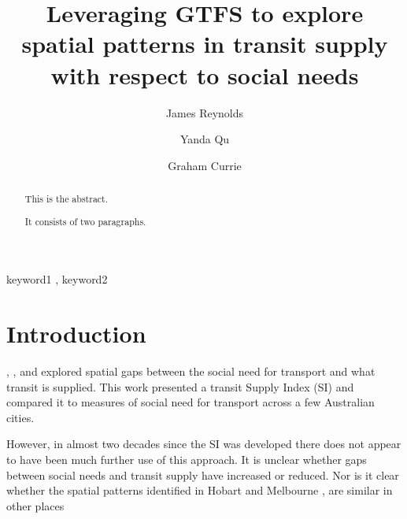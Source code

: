 \documentclass[preprint, 3p,
authoryear]{elsarticle} %
\begin{document}
\begin{frontmatter}

  \title{Leveraging GTFS to explore spatial patterns in transit supply
with respect to social needs}
    \author[Public Transport Research Group (PTRG)]{James Reynolds%
  }
    \author[Public Transport Research Group (PTRG)]{Yanda Qu%
  }
    \author[Public Transport Research Group (PTRG)]{Graham Currie%
  }
  
  \begin{abstract}
  This is the abstract.

  It consists of two paragraphs.
  \end{abstract}
    \begin{keyword}
    keyword1 \sep 
    keyword2
  \end{keyword}
  
 \end{frontmatter}

\section{Introduction}\label{introduction}

\citet{Currie2003Hobart}, \citet{Currie2004Gap},
\citet{Currie2007Identifying} and \citet{currie2010identifying} explored
spatial gaps between the social need for transport and what transit is
supplied. This work presented a transit Supply Index (SI) and compared
it to measures of social need for transport across a few Australian
cities.

However, in almost two decades since the SI was developed there does not
appear to have been much further use of this approach. It is unclear
whether gaps between social needs and transit supply have increased or
reduced. Nor is it clear whether the spatial patterns identified in
Hobart \citep{Currie2003Hobart, Currie2004Gap} and Melbourne
\citep{Currie2007Identifying, currie2010identifying}, are similar in
other places
\end{document}
